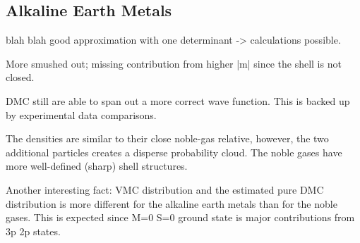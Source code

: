  
 \clearpage
 
 
 \subsection{Alkaline Earth Metals}
 
 blah blah good approximation with one determinant -> calculations possible. 
 
 More smushed out; missing contribution from higher |m| since the shell is not closed. 
 
 DMC still are able to span out a more correct wave function. This is backed up by experimental data comparisons. 
 
 The densities are similar to their close noble-gas relative, however, the two additional particles creates a disperse probability cloud. The noble gases have more well-defined (sharp) shell structures.
 
 Another interesting fact: VMC distribution and the estimated pure DMC distribution is more different for the alkaline earth metals than for the noble gases. This is expected since M=0 S=0 ground state is major contributions from 3p 2p states. 
 
